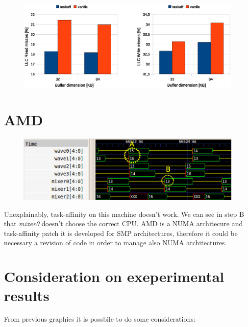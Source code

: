 \begin{figure}[htbp]
\centering
\includegraphics[width=\widefigure]{images/results_i7/l3_load_store_i7.eps}
\caption{}
\label{fig:l2_load_store_i7}
\end{figure}

\newpage
\section{AMD}

\begin{figure}[htbp]
\centering
\includegraphics[width=\widefigure]{images/results_AMD/final_AMD.eps}
\caption{}
\label{fig:trace_AMD}
\end{figure}

Unexplainably, task-affinity on this machine doesn't work. We can see in step B that \textit{mixer0} doesn't choose the correct CPU. AMD is a NUMA 
architecure and task-affinity patch it is developed for SMP architectures, therefore it could be necessary a revision of code in order to manage also 
NUMA architectures.

\section{Consideration on exeperimental results}

From previous graphics it is possbile to do some considerations:

